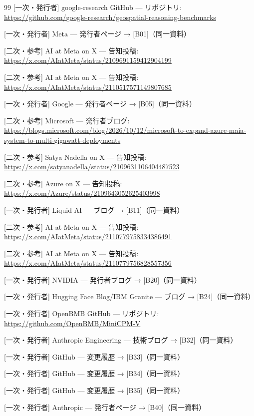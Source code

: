 \documentclass[lualatex,a4paper,10pt]{jlreq}
\begin{document}
\begin{thebibliography}{99}
 [一次・発行者] google-research GitHub — リポジトリ: \url{https://github.com/google-research/geospatial-reasoning-benchmarks}

 [一次・発行者] Meta — 発行者ページ → [B01]（同一資料）

 [二次・参考] AI at Meta on X — 告知投稿: \url{https://x.com/AIatMeta/status/2109691159412904199}

 [二次・参考] AI at Meta on X — 告知投稿: \url{https://x.com/AIatMeta/status/2110517571149807685}

 [一次・発行者] Google — 発行者ページ → [B05]（同一資料）

 [二次・参考] Microsoft — 発行者ブログ: \url{https://blogs.microsoft.com/blog/2026/10/12/microsoft-to-expand-azure-maia-system-to-multi-gigawatt-deployments}

 [二次・参考] Satya Nadella on X — 告知投稿: \url{https://x.com/satyanadella/status/2109631106404487523}

 [二次・参考] Azure on X — 告知投稿: \url{https://x.com/Azure/status/2109643052625403998}

 [一次・発行者] Liquid AI — ブログ → [B11]（同一資料）

 [二次・参考] AI at Meta on X — 告知投稿: \url{https://x.com/AIatMeta/status/2110779758334386491}

 [二次・参考] AI at Meta on X — 告知投稿: \url{https://x.com/AIatMeta/status/2110779756828557356}

 [一次・発行者] NVIDIA — 発行者ブログ → [B20]（同一資料）

 [一次・発行者] Hugging Face Blog/IBM Granite — ブログ → [B24]（同一資料）

 [一次・発行者] OpenBMB GitHub — リポジトリ: \url{https://github.com/OpenBMB/MiniCPM-V}

 [一次・発行者] Anthropic Engineering — 技術ブログ → [B32]（同一資料）

 [一次・発行者] GitHub — 変更履歴 → [B33]（同一資料）

 [一次・発行者] GitHub — 変更履歴 → [B34]（同一資料）

 [一次・発行者] GitHub — 変更履歴 → [B35]（同一資料）

 [一次・発行者] Anthropic — 発行者ページ → [B40]（同一資料）


\end{thebibliography}
\end{document}
